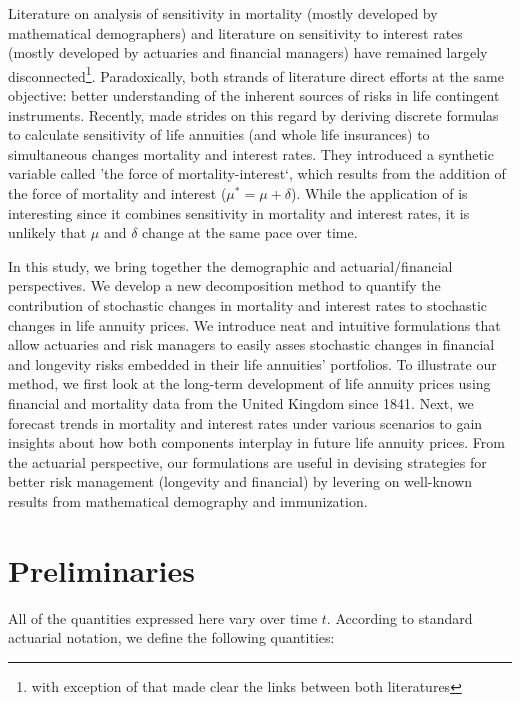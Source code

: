 \documentclass[12pt]{article}
\begin{document}
Literature on analysis of sensitivity in mortality (mostly developed by mathematical demographers) and literature on sensitivity to interest rates (mostly developed by actuaries and financial managers) have remained largely disconnected\footnote{with exception of \citet{Haberman2011} that made clear the links between both literatures}. Paradoxically, both strands of literature direct efforts at the same objective: better understanding of the inherent sources of risks in life contingent instruments. Recently, \citet{lin2020natural} made strides on this regard by deriving discrete formulas to calculate sensitivity of life annuities (and whole life insurances) to simultaneous changes mortality and interest rates. They introduced a synthetic variable called 'the force of mortality-interest`, which results from the addition of the force of mortality and interest ($\mu^*=\mu+\delta$). While the application of \citet{lin2020natural} is interesting since it combines sensitivity in mortality and interest rates, it is unlikely that $\mu$ and $\delta$ change at the same pace over time.

In this study, we bring together the demographic and actuarial/financial perspectives. We develop a new decomposition method to quantify the contribution of stochastic changes in mortality and interest rates to stochastic changes in life annuity prices. We introduce neat and intuitive formulations that allow actuaries and risk managers to easily asses stochastic changes in financial and longevity risks embedded in their life annuities' portfolios. To illustrate our method, we first look at the long-term development of life annuity prices using financial and mortality data from the United Kingdom since 1841. Next, we forecast trends in mortality and interest rates under various scenarios to gain insights about how both components interplay in future life annuity prices. From the actuarial perspective, our formulations are useful in devising strategies for better risk management (longevity and financial) by levering on well-known results from mathematical demography and immunization.






\section{Preliminaries}\label{preliminaries}

All of the quantities expressed here vary over time $t$. According to standard actuarial notation, we define the following quantities:
\end{document}
